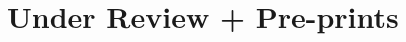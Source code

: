 \documentclass[letterpaper]{deedy-resume} %
\begin{document}
{\begin{etaremune}[itemsep=0.1cm]
\end{etaremune}







  




\section{Under Review + Pre-prints}

}
\end{document}
